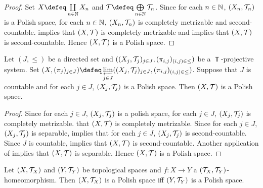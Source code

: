 \documentclass{book}
\begin{document}
\begin{proof} 
	Set $X \defeq \coprod\limits_{n \in \N} X_n$ and $\MT \defeq \bigoplus\limits_{n \in \N} \MT_n$. Since for each $n \in \mathbb{N}$, $(X_n, \mathcal{T}_n)$ is a Polish space, for each $n \in \mathbb{N}$, $(X_n, \mathcal{T}_n)$ is completely metrizable and second-countable.  implies that $(X, \mathcal{T})$ is completely metrizable and  implies that $(X, \mathcal{T})$ is second-countable. Hence $(X, \mathcal{T})$ is a Polish space.
\end{proof}

\begin{ex} 
	Let $(J, {\leq})$ be a directed set and $((X_j, \mathcal{T}_j)_{j \in J}, (\pi_{i,j})_{(i,j) \in {\leq}})$ be a $\Top$-projective system. Set $(X, (\pi_j)_{j \in J}) \defeq \varprojlim\limits_{j \in J} ((X_j, \MT_j)_{j \in J}, (\pi_{i,j})_{(i,j) \in {\leq}})$. Suppose that $J$ is countable and for each $j \in J$, $(X_j, \mathcal{T}_j)$ is a Polish space. Then $(X, \mathcal{T})$ is a Polish space.
\end{ex}

\begin{proof}
	Since for each $j \in J$, $(X_j, \mathcal{T}_j)$ is a polish space, for each $j \in J$, $(X_j, \mathcal{T}_j)$ is completely metrizable.  that $(X, \mathcal{T})$ is completely metrizable. Since for each $j \in J$, $(X_j, \mathcal{T}_j)$ is separable,  implies that for each $j \in J$, $(X_j, \mathcal{T}_j)$ is second-countable. Since $J$ is countable,  implies that $(X, \mathcal{T})$ is second-countable. Another application of  implies that $(X, \mathcal{T})$ is separable. Hence $(X, \mathcal{T})$ is a Polish space.
\end{proof}



\begin{ex} 
	Let $(X, \mathcal{T}_X)$ and $(Y, \mathcal{T}_Y)$ be topological spaces and $f:X \rightarrow Y$ a $(\mathcal{T}_X, \mathcal{T}_Y)$-homeomorphism. Then $(X, \mathcal{T}_X)$ is a Polish space iff $(Y, \mathcal{T}_Y)$ is a Polish space.
\end{ex}
\end{document}

